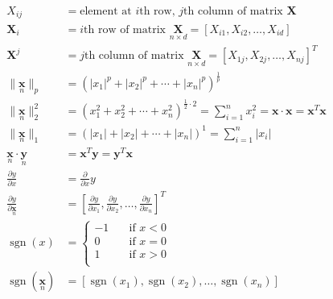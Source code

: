 \newcommand{\matrix}[1]{\mathbf{#1}}
\newcommand{\vector}[1]{\mathbf{#1}}
\DeclareMathOperator{\sgn}{sgn}
\begin{align*}
X_{ij} &= \text{element at } i\text{th row, } j\text{th column of matrix } \matrix{X} \\
\matrix{X}_i &= i\text{th row of matrix } \underset{n \times d}{\matrix{X}} = \left[ X_{i1}, X_{i2}, \ldots, X_{id} \right] \\
\matrix{X}^j &= j\text{th column of matrix } \underset{n \times d}{\matrix{X}} = \left[ X_{1j}, X_{2j}, \ldots, X_{nj} \right]^T \\
\|\underset{n}{\vector{x}}\|_p &= \left( |x_1|^p + |x_2|^p + \cdots + |x_n|^p \right)^\frac{1}{p} \\
\|\underset{n}{\vector{x}}\|_2^2 &= \left( x_1^2 + x_2^2 + \cdots + x_n^2 \right)^{\frac{1}{2} \cdot 2} = \sum_{i=1}^{n}{x_i^2} = \vector{x} \cdot \vector{x} = \vector{x}^T\vector{x} \\
\|\underset{n}{\vector{x}}\|_1 &= \left( |x_1| + |x_2| + \cdots + |x_n| \right)^1 = \sum_{i=1}^{n}{|x_i|} \\
\underset{n}{\vector{x}} \cdot \underset{n}{\vector{y}} &= \vector{x}^T\vector{y} = \vector{y}^T\vector{x} \\
\frac{\partial y}{\partial x} &= \frac{\partial}{\partial x}y \\
\frac{\partial y}{\partial \underset{n}{\vector{x}}} &= \left[ \frac{\partial y}{\partial x_1}, \frac{\partial y}{\partial x_2}, \ldots, \frac{\partial y}{\partial x_n} \right]^T \\
\sgn(x) &=
\begin{cases}
    -1 & \quad \text{if } x < 0 \\
     0 & \quad \text{if } x = 0 \\
     1 & \quad \text{if } x > 0 \\
\end{cases} \\
\sgn(\underset{n}{\vector{x}}) &= \left[ \sgn(x_1), \sgn(x_2), \ldots, \sgn(x_n) \right] \\
\end{align*}
